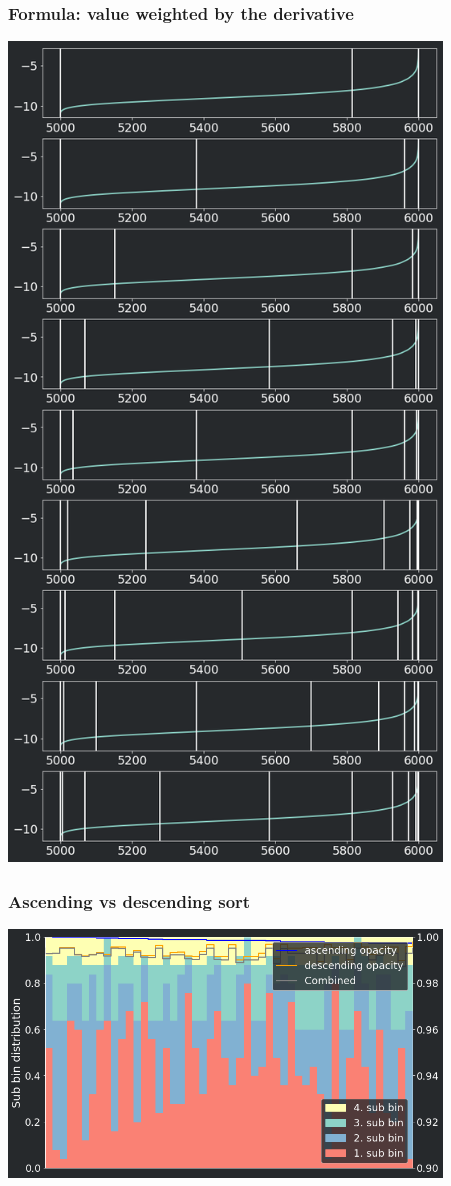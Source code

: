 \frame
{
	\frametitle{Formula: value weighted by the derivative}
	\centering
	\includegraphics[width=115mm]{images/smart_sub_bins}
}
\frame
{
	\frametitle{Ascending vs descending sort}
	\centering
	\includegraphics[width=115mm]{images/ascending_descending}
}
